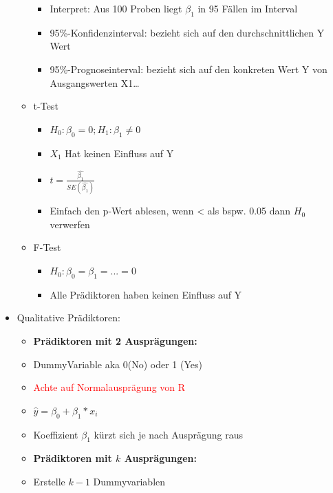 \documentclass[a4paper]{article}
\begin{document}
\begin{landscape}
\begin{multicols}{3}
\begin{itemize}[noitemsep,nolistsep,leftmargin=*]
\begin{itemize}[noitemsep,nolistsep,leftmargin=*]
\begin{itemize}[noitemsep,nolistsep,leftmargin=*]
                    \item Interpret: Aus 100 Proben liegt $ \beta_1$ in 95 Fällen im Interval
                    \item 95\%-Konfidenzinterval: bezieht sich auf den durchschnittlichen Y Wert
                    \item 95\%-Prognoseinterval: bezieht sich auf den konkreten Wert Y von Ausgangswerten X1\dots
                \end{itemize}
                \item t-Test
                \begin{itemize}[noitemsep,nolistsep,leftmargin=*]
                    \item $H_0: \beta_0 = 0; H_1: \beta_1 \neq 0$
                    \item $X_1$ Hat keinen Einfluss auf Y
                    \item $t = \frac{\hat{\beta_1}}{SE(\hat{\beta_1})}$
                    \item Einfach den p-Wert ablesen, wenn < als bspw. 0.05 dann $H_0$ verwerfen
                \end{itemize}
                \item F-Test
                \begin{itemize}[noitemsep,nolistsep,leftmargin=*]
                    \item $H_0: \beta_0 = \beta_1 = ... = 0$
                    \item Alle Prädiktoren haben keinen Einfluss auf Y
                \end{itemize}
            \end{itemize}
            \item Qualitative Prädiktoren:
            \begin{itemize}[noitemsep,nolistsep,leftmargin=*]
                \item \textbf{Prädiktoren mit 2 Ausprägungen:}
                \item DummyVariable aka 0(No) oder 1 (Yes)
                \item \textcolor{red}{Achte auf Normalausprägung von R}
                \item $\hat{y} = \beta_0 + \beta_1*x_i $
                \item Koeffizient $\beta_1$ kürzt sich je nach Ausprägung raus
                \item \textbf{Prädiktoren mit $k$ Ausprägungen:}
                \item Erstelle $k-1$ Dummyvariablen

\end{itemize}
\end{itemize}
\end{multicols}
\end{landscape}
\end{document}
